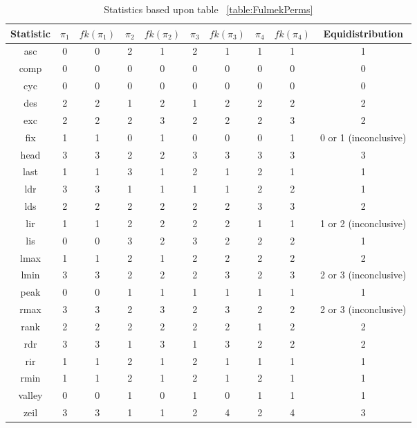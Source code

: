 \documentclass[12pt]{article}
\begin{document}
\begin{table}[H]
\caption{Statistics based upon table ~\ref{table:FulmekPerms}}
\centering
\begin{tabular}{c | c c c c c c c c | c}
\hline\hline
Statistic & $\pi_1$ & $fk(\pi_1)$ & $\pi_2$ & $fk(\pi_2)$ & $\pi_3$ & $fk(\pi_3)$ & $\pi_4$ & $fk(\pi_4)$ & Equidistribution\\ [0.5ex]
\hline
asc & 0 & 0 & 2 & 1 & 2 & 1 & 1 & 1 & 1\\ 
comp & 0 & 0 & 0 & 0 & 0 & 0 & 0 & 0 & 0\\
cyc & 0 & 0 & 0 & 0 & 0 & 0 & 0 & 0 & 0\\
des & 2 & 2 & 1 & 2 & 1 & 2 & 2 & 2 & 2\\
exc & 2 & 2 & 2 & 3 & 2 & 2 & 2 & 3 & 2\\
fix & 1 & 1 & 0 & 1 & 0 & 0 & 0 & 1 & 0 or 1 (inconclusive)\\
head & 3 & 3 & 2 & 2 & 3 & 3 & 3 & 3 & 3\\
last & 1 & 1 & 3 & 1 & 2 & 1 & 2 & 1 & 1\\
ldr & 3 & 3 & 1 & 1 & 1 & 1 & 2 & 2 & 1\\
lds & 2 & 2 & 2 & 2 & 2 & 2 & 3 & 3 & 2\\
lir & 1 & 1 & 2 & 2 & 2 & 2 & 1 & 1 & 1 or 2 (inconclusive)\\
lis & 0 & 0 & 3 & 2 & 3 & 2 & 2 & 2 & 1\\
lmax & 1 & 1 & 2 & 1 & 2 & 2 & 2 & 2 & 2\\
lmin & 3 & 3 & 2 & 2 & 2 & 3 & 2 & 3 & 2 or 3 (inconclusive)\\
peak & 0 & 0 & 1 & 1 & 1 & 1 & 1 & 1 & 1\\
rmax & 3 & 3 & 2 & 3 & 2 & 3 & 2 & 2 & 2 or 3 (inconclusive)\\
rank & 2 & 2 & 2 & 2 & 2 & 2 & 1 & 2 & 2\\
rdr & 3 & 3 & 1 & 3 & 1 & 3 & 2 & 2 & 2\\
rir & 1 & 1 & 2 & 1 & 2 & 1 & 1 & 1 & 1\\
rmin & 1 & 1 & 2 & 1 & 2 & 1 & 2 & 1 & 1\\
valley & 0 & 0 & 1 & 0 & 1 & 0 & 1 & 1 & 1\\
zeil & 3 & 3 & 1 & 1 & 2 & 4 & 2 & 4 & 3\\
\hline
\end{tabular}
\label{table:FulmekPerms1}
\end{table}
\newpage
\end{document}
